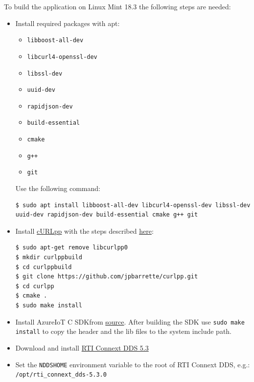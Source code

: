 \documentclass{article}
\begin{document}
To build the application on Linux Mint 18.3 the following steps are needed:

\begin{itemize}
\item Install required packages with apt: 
\begin{itemize}
\item \verb+libboost-all-dev+
\item \verb+libcurl4-openssl-dev+
\item \verb+libssl-dev+ %
\item \verb+uuid-dev+
\item \verb+rapidjson-dev+
\item \verb+build-essential+
\item \verb+cmake+
\item \verb!g++!
\item \verb+git+
\end{itemize}
Use the following command:
\begin{lstlisting}
$ sudo apt install libboost-all-dev libcurl4-openssl-dev libssl-dev uuid-dev rapidjson-dev build-essential cmake g++ git
\end{lstlisting}
\item Install \href{http://www.curlpp.org/}{cURLpp} with the steps described \href{https://github.com/beniz/deepdetect/issues/126}{here}:
\begin{verbatim}
$ sudo apt-get remove libcurlpp0
$ mkdir curlppbuild
$ cd curlppbuild
$ git clone https://github.com/jpbarrette/curlpp.git
$ cd curlpp
$ cmake .
$ sudo make install
\end{verbatim} 
\item Install AzureIoT C SDKfrom \href{https://github.com/Azure/azure-iot-sdk-c/blob/master/doc/devbox_setup.md}{source}. After building the SDK use \verb+sudo make install+ to copy the header and the lib files to the system include path.
\item Download and install \href{https://www.rti.com/gettingstarted/installlinux_secure}{RTI Connext DDS 5.3}
\item Set the \verb+NDDSHOME+ environment variable to the root of RTI Connext DDS, e.g.: \verb+/opt/rti_connext_dds-5.3.0+
\end{itemize}
\end{document}
